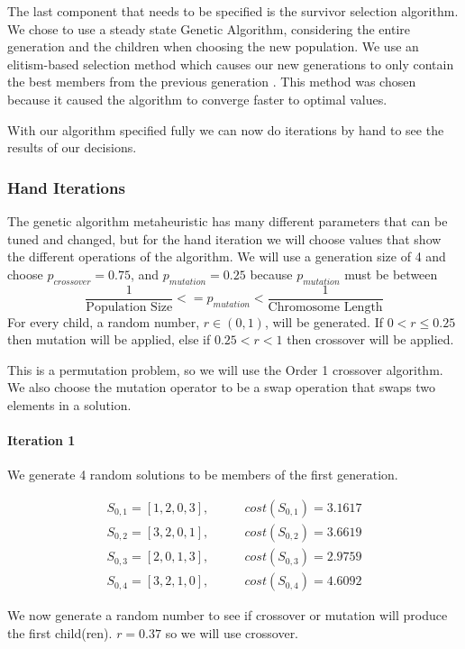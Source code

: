\documentclass[a4paper]{article}
\newcommand{\subsubsubsection}[1]{\paragraph{#1} \mbox{}}
\begin{document}
The last component that needs to be specified is the survivor selection algorithm. We chose to use a steady state Genetic Algorithm, considering the entire generation and the children when choosing the new population. We use an elitism-based selection method which causes our new generations to only contain the best members from the previous generation \cite{Talk}. This method was chosen because it caused the algorithm to converge faster to optimal values.

With our algorithm specified fully we can now do iterations by hand to see the results of our decisions.

\subsubsection{Hand Iterations}

The genetic algorithm metaheuristic has many different parameters that can be tuned and changed, but for the hand iteration we will choose values that show the different operations of the algorithm. We will use a generation size of 4 and choose $p_\mathit{crossover}=0.75$, and $p_\mathit{mutation}=0.25$ because $p_\mathit{mutation}$ must be between $$\frac{1}{\text{Population Size}} <= p_\mathit{mutation} < \frac{1}{\text{Chromosome Length}}$$ For every child, a random number, $r \in (0,1)$, will be generated. If $0<r\leq0.25$ then mutation will be applied, else if $0.25<r<1$ then crossover will be applied.

This is a permutation problem, so we will use the Order 1 crossover algorithm. We also choose the mutation operator to be a swap operation that swaps two elements in a solution.

\subsubsubsection{Iteration 1}

We generate 4 random solutions to be members of the first generation.

\begin{align*}
S_{0,1} = [1, 2, 0, 3], & \qquad cost(S_{0,1}) = 3.1617 \\
S_{0,2} = [3, 2, 0, 1], & \qquad cost(S_{0,2}) = 3.6619 \\
S_{0,3} = [2, 0, 1, 3], & \qquad cost(S_{0,3}) = 2.9759 \\
S_{0,4} = [3, 2, 1, 0], & \qquad cost(S_{0,4}) = 4.6092
\end{align*}

We now generate a random number to see if crossover or mutation will produce the first child(ren). $r=0.37$ so we will use crossover.
\end{document}
